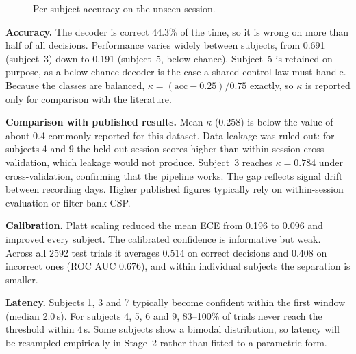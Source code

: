 \documentclass[11pt,a4paper]{article}
\begin{document}
\begin{figure}[h]
\centering
{}
\caption{Per-subject accuracy on the unseen session.}
\label{fig:acc}
\end{figure}

\textbf{Accuracy.} The decoder is correct 44.3\% of the time, so it is wrong on
more than half of all decisions. Performance varies widely between subjects,
from 0.691 (subject~3) down to 0.191 (subject~5, below chance). Subject~5 is
retained on purpose, as a below-chance decoder is the case a shared-control
law must handle. Because the classes are balanced, $\kappa = (\text{acc}-0.25)/0.75$
exactly, so $\kappa$ is reported only for comparison with the literature.

\textbf{Comparison with published results.} Mean $\kappa$ (0.258) is below the
value of about 0.4 commonly reported for this dataset. Data leakage was ruled
out: for subjects 4 and 9 the held-out session scores higher than
within-session cross-validation, which leakage would not produce. Subject~3
reaches $\kappa = 0.784$ under cross-validation, confirming that the pipeline
works. The gap reflects signal drift between recording days. Higher published
figures typically rely on within-session evaluation or filter-bank CSP.

\textbf{Calibration.} Platt scaling reduced the mean ECE from 0.196 to 0.096 and
improved every subject. The calibrated confidence is informative but weak.
Across all 2592 test trials it averages 0.514 on correct decisions and 0.408 on
incorrect ones (ROC AUC 0.676), and within individual subjects the separation is
smaller.

\textbf{Latency.} Subjects 1, 3 and 7 typically become confident within the
first window (median 2.0\,s). For subjects 4, 5, 6 and 9, 83--100\% of trials
never reach the threshold within 4\,s. Some subjects show a bimodal
distribution, so latency will be resampled empirically in Stage~2 rather than
fitted to a parametric form.
\end{document}
